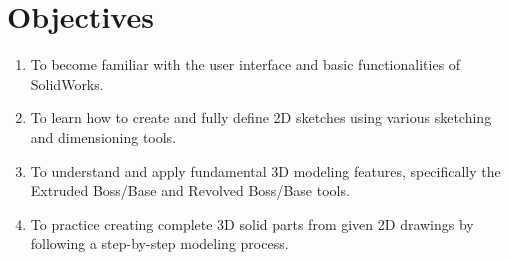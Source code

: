 \section{Objectives}
\begin{enumerate}
  \setlength{\itemsep}{0pt}
        \setlength{\parskip}{0pt}
        \setlength{\parsep}{0pt}
  \item To become familiar with the user interface and basic functionalities of SolidWorks.
  \item To learn how to create and fully define 2D sketches using various sketching and dimensioning tools.
  \item To understand and apply fundamental 3D modeling features, specifically the Extruded Boss/Base and Revolved Boss/Base tools.
  \item To practice creating complete 3D solid parts from given 2D drawings by following a step-by-step modeling process.
\end{enumerate}
